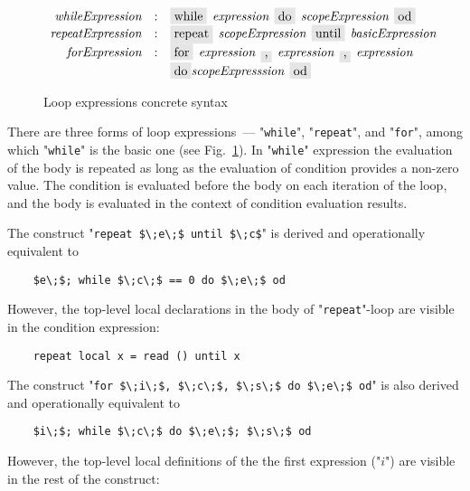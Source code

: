 \begin{figure}[t]
  \[
    \begin{array}{rcl}
      \defterm{whileExpression}  & : & \term{while}\s\nonterm{expression}\s\term{do}\s\nonterm{scopeExpression}\s\term{od}\\
      \defterm{repeatExpression} & : & \term{repeat}\s\nonterm{scopeExpression}\s\term{until}\s\nonterm{basicExpression}\\
      \defterm{forExpression}    & : & \term{for}\s\nonterm{expression}\s\term{,}\s\nonterm{expression}\s\term{,}\s\nonterm{expression}\\
                                 &   & \term{do}\nonterm{scopeExpresssion}\s\term{od}
    \end{array}
  \]
  \caption{Loop expressions concrete syntax}
  \label{loop_expression}
\end{figure}

There are three forms of loop expressions~--- "\lstinline|while|", "\lstinline|repeat|", and "\lstinline|for|", among which "\lstinline|while|" is the
basic one (see Fig.~\ref{loop_expression}). In "\lstinline|while|" expression the evaluation of the body is repeated as long as the evaluation of condition provides
a non-zero value. The condition is evaluated before the body on each iteration of the loop, and the body is evaluated in the context of
condition evaluation results.

The construct "\lstinline|repeat $\;e\;$ until $\;c$|" is derived and operationally equivalent to

\begin{lstlisting}
    $e\;$; while $\;c\;$ == 0 do $\;e\;$ od
\end{lstlisting}

However, the top-level local declarations in the body of "\lstinline|repeat|"-loop are visible in the condition expression:

\begin{lstlisting}
    repeat local x = read () until x 
\end{lstlisting}


The construct "\lstinline|for $\;i\;$, $\;c\;$, $\;s\;$ do $\;e\;$ od|" is also derived and operationally equivalent to

\begin{lstlisting}
    $i\;$; while $\;c\;$ do $\;e\;$; $\;s\;$ od
\end{lstlisting}

However, the top-level local definitions of the the first expression ("$i$") are visible in the rest of the construct:

